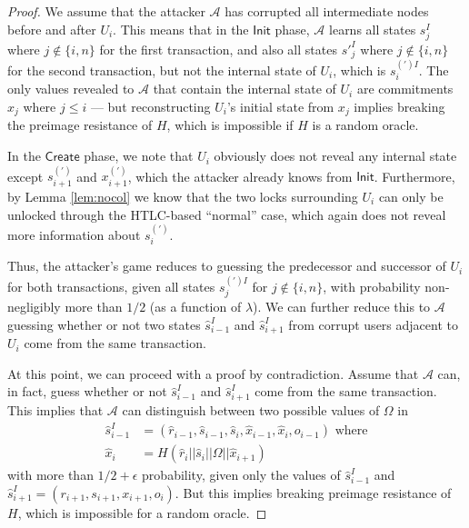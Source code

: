 \documentclass[USenglish,oneside,twocolumn]{article}
\begin{document}
\begin{proof}
    We assume that the attacker $\mathcal{A}$ has corrupted all intermediate nodes before and after $U_i$. This means that in the $\mathsf{Init}$ phase, $\mathcal{A}$ learns all states $s^I_j$ where $j \notin \{ i, n \}$ for the first transaction, and also all states $s'^I_j$ where $j \notin \{ i, n \}$ for the second transaction, but not the internal state of $U_i$, which is $s^{(')I}_i$. The only values revealed to $\mathcal{A}$ that contain the internal state of $U_i$ are commitments $x_j$ where $j \leq i$ --- but reconstructing $U_i$'s initial state from $x_j$ implies breaking the preimage resistance of $H$, which is impossible if $H$ is a random oracle.

    In the $\mathsf{Create}$ phase, we note that $U_i$ obviously does not reveal any internal state except $s^{(')}_{i+1}$ and $x^{(')}_{i+1}$, which the attacker already knows from $\mathsf{Init}$. Furthermore, by Lemma \ref{lem:nocol} we know that the two locks surrounding $U_i$ can only be unlocked through the HTLC-based ``normal'' case, which again does not reveal more information about $s^{(')}_{i}$.

    Thus, the attacker's game reduces to guessing the predecessor and successor of $U_i$ for both transactions, given all states $s^{(')I}_{j}$ for $j \notin \{ i, n \}$, with probability non-negligibly more than $1/2$ (as a function of $\lambda$). We can further reduce this to $\mathcal{A}$ guessing whether or not two states $\hat{s}_{i-1}^I$ and $\hat{s}_{i+1}^I$ from corrupt users adjacent to $U_i$ come from the same transaction.

    At this point, we can proceed with a proof by contradiction. Assume that $\mathcal{A}$ can, in fact, guess whether or not $\hat{s}_{i-1}^I$ and $\hat{s}_{i+1}^I$ come from the same transaction. This implies that $\mathcal{A}$ can distinguish between two possible values of $\Omega$ in
    \begin{align*}
        \hat{s}_{i-1}^I & = (\hat{r}_{i-1}, \hat{s}_{i-1}, \hat{s}_i, \hat{x}_{i-1}, \hat{x}_i, o_{i-1}) \text{ where} \\
        \hat{x}_i       & = H(\hat{r}_i||\hat{s}_i||{\Omega}||\hat{x}_{i+1})
    \end{align*}
    with more than $1/2 + \epsilon$ probability, given only the values of $\hat{s}_{i-1}^I$ and $\hat{s}_{i+1}^I=(r_{i+1},s_{i+1},x_{i+1},o_i)$. But this implies breaking preimage resistance of $H$, which is impossible for a random oracle.
\end{proof}
\end{document}
